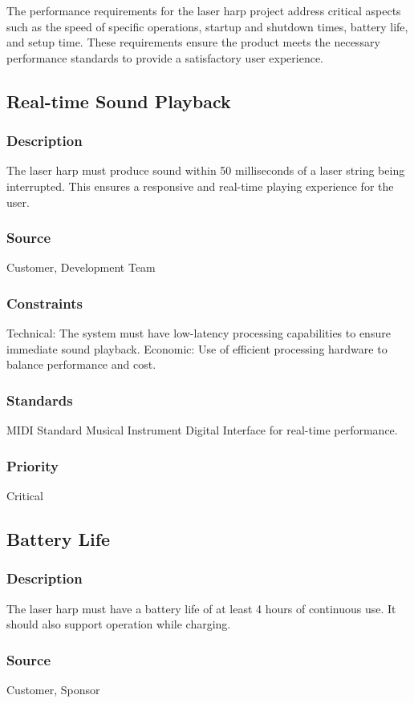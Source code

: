 The performance requirements for the laser harp project address critical aspects such as the speed of specific operations, startup and shutdown times, battery life, and setup time. These requirements ensure the product meets the necessary performance standards to provide a satisfactory user experience.

\subsection{Real-time Sound Playback}
\subsubsection{Description}
The laser harp must produce sound within 50 milliseconds of a laser string being interrupted. This ensures a responsive and real-time playing experience for the user.
\subsubsection{Source}
Customer, Development Team
\subsubsection{Constraints}
Technical: The system must have low-latency processing capabilities to ensure immediate sound playback.
Economic: Use of efficient processing hardware to balance performance and cost.
\subsubsection{Standards}
MIDI Standard Musical Instrument Digital Interface for real-time performance.
\subsubsection{Priority}
Critical


\subsection{Battery Life}
\subsubsection{Description}
The laser harp must have a battery life of at least 4 hours of continuous use. It should also support operation while charging.
\subsubsection{Source}
Customer, Sponsor
